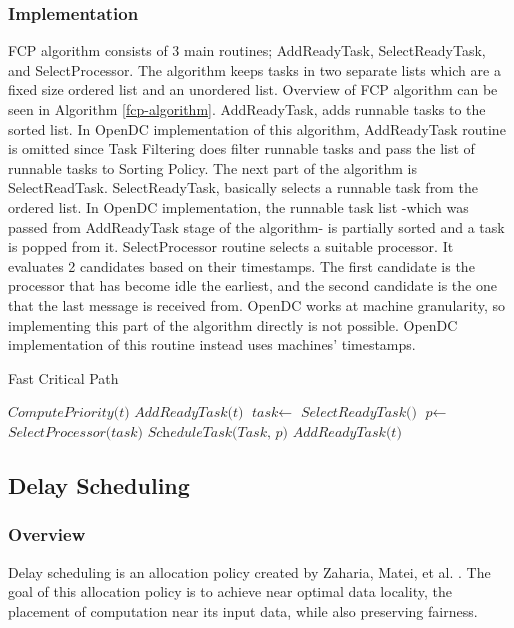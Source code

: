 \documentclass{article}
\begin{document}
\subsubsection{Implementation}
FCP algorithm consists of 3 main routines; AddReadyTask, SelectReadyTask, and SelectProcessor. The algorithm keeps tasks in two separate lists which are a fixed size ordered list and an unordered list. Overview of FCP algorithm can be seen in Algorithm \ref{fcp-algorithm}. AddReadyTask, adds runnable tasks to the sorted list. In OpenDC implementation of this algorithm, AddReadyTask routine is omitted since Task Filtering does filter runnable tasks and pass the list of runnable tasks to Sorting Policy. The next part of the algorithm is SelectReadTask. SelectReadyTask, basically selects a runnable task from the ordered list. In OpenDC implementation, the runnable task list -which was passed from AddReadyTask stage of the algorithm- is partially sorted and a task is popped from it. 
SelectProcessor routine selects a suitable processor. It evaluates 2 candidates based on their timestamps. The first candidate is the processor that has become idle the earliest, and the second candidate is the one that the last message is received from. OpenDC works at machine granularity, so implementing this part of the algorithm directly is not possible. OpenDC implementation of this routine instead uses machines’ timestamps. 

\begin{algorithm}[H]
\caption{Fast Critical Path}\label{fcp-algorithm}
\begin{algorithmic}[1]
\State $\textit{ComputePriority(t)}$
\State $\textit{AddReadyTask(t)}$
\EndIf
\EndFor
{}
\State $\textit{task} \gets$ $\textit{SelectReadyTask()}$ 
\State $\textit{p} \gets$ $\textit{SelectProcessor(task)}$
\State $\textit{ScheduleTask(Task, p)}$
\State $\textit{AddReadyTask(t)}$
\EndFor
\EndWhile
\end{algorithmic}
\end{algorithm}


\subsection{Delay Scheduling}
\subsubsection{Overview}
Delay scheduling is an allocation policy created by Zaharia, Matei, et al. \cite{zaharia2010delay}. The goal of this allocation policy is to achieve near optimal data locality, the placement of computation near its input data, while also preserving fairness. 
\end{document}
